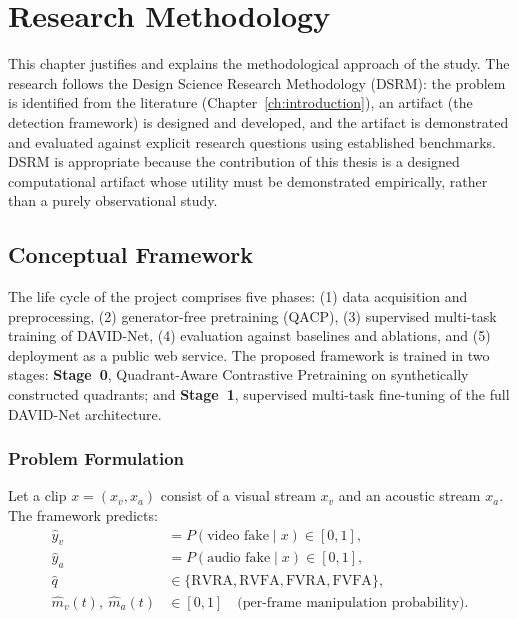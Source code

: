 \chapter{Research Methodology}
\label{ch:methodology}

This chapter justifies and explains the methodological approach of the study.
The research follows the Design Science Research Methodology (DSRM): the
problem is identified from the literature (Chapter~\ref{ch:introduction}), an
artifact (the detection framework) is designed and developed, and the artifact
is demonstrated and evaluated against explicit research questions using
established benchmarks. DSRM is appropriate because the contribution of this
thesis is a designed computational artifact whose utility must be demonstrated
empirically, rather than a purely observational study.

\section{Conceptual Framework}
\label{sec:framework}

The life cycle of the project comprises five phases: (1) data acquisition and
preprocessing, (2) generator-free pretraining (QACP), (3) supervised multi-task
training of DAVID-Net, (4) evaluation against baselines and ablations, and
(5) deployment as a public web service. The proposed framework is trained in
two stages: \textbf{Stage~0}, Quadrant-Aware Contrastive Pretraining on
synthetically constructed quadrants; and \textbf{Stage~1}, supervised
multi-task fine-tuning of the full DAVID-Net architecture.

\subsection{Problem Formulation}
Let a clip $x = (x_v, x_a)$ consist of a visual stream $x_v$ and an acoustic
stream $x_a$. The framework predicts:
\begin{align}
  \hat{y}_v &= P(\text{video fake} \mid x) \in [0,1], \\
  \hat{y}_a &= P(\text{audio fake} \mid x) \in [0,1], \\
  \hat{q}   &\in \{\text{RVRA}, \text{RVFA}, \text{FVRA}, \text{FVFA}\}, \\
  \hat{m}_v(t),\ \hat{m}_a(t) &\in [0,1] \quad \text{(per-frame manipulation probability)}.
\end{align}

